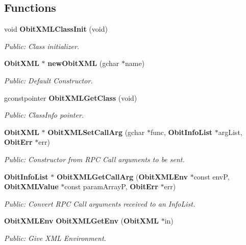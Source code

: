 \subsection*{Functions}
\begin{CompactItemize}
\item 
void {\bf Obit\-XMLClass\-Init} (void)
\begin{CompactList}\small\item\em Public: Class initializer. \item\end{CompactList}\item 
{\bf Obit\-XML} $\ast$ {\bf new\-Obit\-XML} (gchar $\ast$name)
\begin{CompactList}\small\item\em Public: Default Constructor. \item\end{CompactList}\item 
gconstpointer {\bf Obit\-XMLGet\-Class} (void)
\begin{CompactList}\small\item\em Public: Class\-Info pointer. \item\end{CompactList}\item 
{\bf Obit\-XML} $\ast$ {\bf Obit\-XMLSet\-Call\-Arg} (gchar $\ast$func, {\bf Obit\-Info\-List} $\ast$arg\-List, {\bf Obit\-Err} $\ast$err)
\begin{CompactList}\small\item\em Public: Constructor from RPC Call arguments to be sent. \item\end{CompactList}\item 
{\bf Obit\-Info\-List} $\ast$ {\bf Obit\-XMLGet\-Call\-Arg} ({\bf Obit\-XMLEnv} $\ast$const env\-P, {\bf Obit\-XMLValue} $\ast$const param\-Array\-P, {\bf Obit\-Err} $\ast$err)
\begin{CompactList}\small\item\em Public: Convert RPC Call arguments received to an Info\-List. \item\end{CompactList}\item 
{\bf Obit\-XMLEnv} {\bf Obit\-XMLGet\-Env} ({\bf Obit\-XML} $\ast$in)
\begin{CompactList}\small\item\em Public: Give XML Environment. \item\end{CompactList}\item 

\end{CompactItemize}
